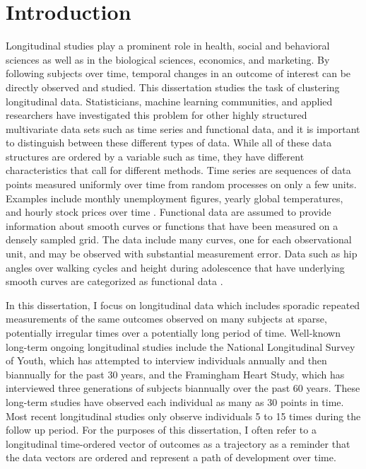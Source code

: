 \chapter{Introduction}\label{chap: intro}

Longitudinal studies play a prominent role in health, social and behavioral sciences as well as in the biological sciences, economics, and marketing. By following subjects over time, temporal changes in an outcome of interest can be directly observed and studied. This dissertation studies the task of clustering longitudinal data. Statisticians, machine learning communities, and applied researchers have investigated this problem for other highly structured multivariate data sets such as time series and functional data, and it is important to distinguish between these different types of data. While all of these data structures are ordered by a variable such as time, they have different characteristics that call for different methods. Time series are sequences of data points measured uniformly over time from random processes on only a few units. Examples include monthly unemployment figures, yearly global temperatures, and hourly stock prices over time \cite{shumway2011}. Functional data are assumed to provide information about smooth curves or functions that have been measured on a densely sampled grid. The data include many curves, one for each observational unit, and may be observed with substantial measurement error. Data such as hip angles over walking cycles and height during adolescence that have underlying smooth curves are categorized as functional data \cite{ramsay2002,ramsay2005}. 

In this dissertation, I focus on longitudinal data which includes sporadic repeated measurements of the same outcomes observed on many subjects at sparse, potentially irregular times over a potentially long period of time. Well-known long-term ongoing longitudinal studies include the National Longitudinal Survey of Youth, which has attempted to interview individuals annually and then biannually for the past 30 years, and the Framingham Heart Study, which has interviewed three generations of subjects biannually over the past 60 years. These long-term studies have observed each individual as many as 30 points in time. Most recent longitudinal studies only observe individuals 5 to 15 times during the follow up period. For the purposes of this dissertation, I often refer to a longitudinal time-ordered vector of outcomes as a trajectory as a reminder that the data vectors are ordered and represent a path of development over time. 

